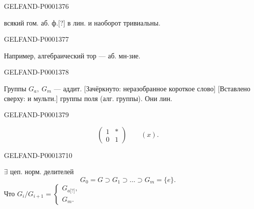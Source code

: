 \begin{GelfandAdjacentEvidence}{GELFAND-P000137}{6}

 всякий гом. аб. ф.[?] в лин. и наоборот тривиальны.
\end{GelfandAdjacentEvidence}
\begin{GelfandAdjacentEvidence}{GELFAND-P000137}{7}

Например, алгебраический тор — аб. мн-зие.
\end{GelfandAdjacentEvidence}
\begin{GelfandAdjacentEvidence}{GELFAND-P000137}{8}


Группы $G_a,\ G_m$ — аддит. [Зачёркнуто: неразобранное короткое слово] [Вставлено сверху: и мульти.] группы поля (алг. группы). Они лин.
\end{GelfandAdjacentEvidence}
\begin{GelfandAdjacentEvidence}{GELFAND-P000137}{9}

\begin{equation*}
\begin{pmatrix}1&*\\0&1\end{pmatrix}\qquad(x).
\end{equation*}
\end{GelfandAdjacentEvidence}
\begin{GelfandAdjacentEvidence}{GELFAND-P000137}{10}

 $\exists$ цеп. норм. делителей
\begin{equation*}
G_0=G\supset G_1\supset\ldots\supset G_m=\{e\}.
\end{equation*}
Что $G_i/G_{i+1}=\begin{cases}G_{a\text{[?]}},\\G_m.\end{cases}$
\end{GelfandAdjacentEvidence}
